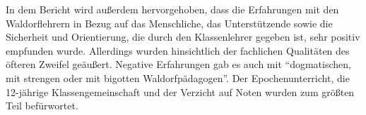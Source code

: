 In dem Bericht wird außerdem hervorgehoben, dass die Erfahrungen mit den Waldorflehrern in Bezug auf das Menschliche, das Unterstützende sowie die Sicherheit und Orientierung, die durch den Klassenlehrer gegeben ist, sehr positiv empfunden wurde. 
Allerdings wurden hinsichtlich der fachlichen Qualitäten des öfteren Zweifel geäußert. 
Negative Erfahrungen gab es auch mit \enquote{dogmatischen, mit strengen oder mit bigotten Waldorfpädagogen}. 
Der Epochenunterricht, die 12-jährige Klassengemeinschaft und der Verzicht auf Noten wurden zum größten Teil befürwortet. 














